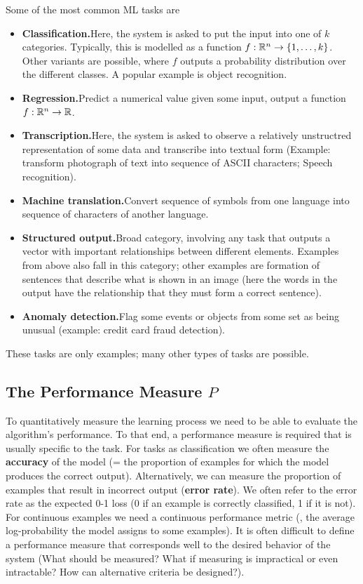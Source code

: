 Some of the most common ML tasks are
\begin{itemize}
\item \textbf{Classification.}\qquad Here, the system is asked to put
  the input into one of $k$ categories. Typically, this is modelled as
  a function $f:\mathbb{R}^n \rightarrow \{1,\dots,k\}$. Other variants are
  possible, where $f$ outputs a probability distribution over the
  different classes. A popular example is object recognition.
\item \textbf{Regression.}\qquad Predict a numerical value given some
  input, \ie output a function $f:\mathbb{R}^n \rightarrow \mathbb{R}$.
\item \textbf{Transcription.}\qquad Here, the system is asked to
  observe a relatively unstructred representation of some data and
  transcribe into textual form (Example: transform photograph of text
  into sequence of ASCII characters; Speech recognition).
\item \textbf{Machine translation.}\qquad Convert sequence of symbols
  from one language into sequence of characters of another language.
\item \textbf{Structured output.}\qquad Broad category, involving any
  task that outputs a vector with important relationships between
  different elements. Examples from above also fall in this category;
  other examples are formation of sentences that describe what is
  shown in an image (here the words in the output have the
  relationship that they must form a correct sentence).
\item \textbf{Anomaly detection.}\qquad Flag some events or objects
  from some set as being unusual (example: credit card fraud
  detection).  
\end{itemize}
These tasks are only examples; many other types of tasks are possible.

\subsection*{The Performance Measure $P$}
To quantitatively measure the learning process we need to be able to
evaluate the algorithm's performance. To that end, a performance
measure is required that is usually specific to the task. For tasks as
classification we often measure the \textbf{accuracy} of the model (=
the proportion of examples for which the model produces the correct
output). Alternatively, we can measure the proportion of examples that
result in incorrect output (\textbf{error rate}). We often refer to
the error rate as the expected 0-1 loss (0 if an example is correctly
classified, 1 if it is not). For continuous examples we need a
continuous performance metric (\eg, the average log-probability the
model assigns to some examples). It is often difficult to define a
performance measure that corresponds well to the desired behavior of
the system (What should be measured? What if measuring is impractical
or even intractable? How can alternative criteria be designed?).

